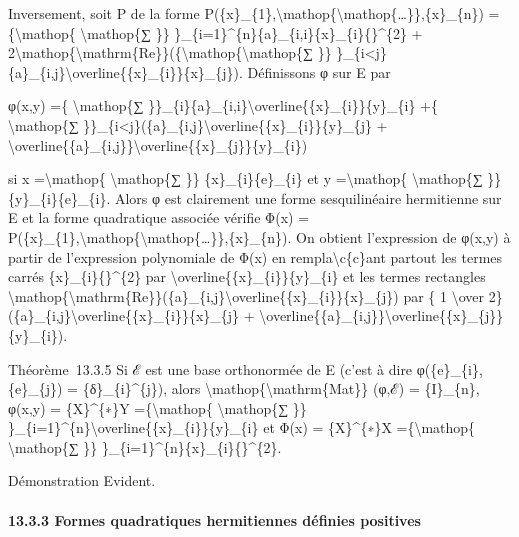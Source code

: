 \documentclass[]{article}
\begin{document}
Inversement, soit P de la forme
P(\{x\}\_\{1\},\textbackslash{}mathop\{\textbackslash{}mathop\{\ldots{}\}\},\{x\}\_\{n\})
=\{\textbackslash{}mathop\{ \textbackslash{}mathop\{∑ \}\}
\}\_\{i=1\}\^{}\{n\}\{a\}\_\{i,i\}\textbar{}\{x\}\_\{i\}\{\textbar{}\}\^{}\{2\}
+
2\textbackslash{}mathop\{\textbackslash{}mathrm\{Re\}\}(\{\textbackslash{}mathop\{\textbackslash{}mathop\{∑
\}\}
\}\_\{i\textless{}j\}\{a\}\_\{i,j\}\textbackslash{}overline\{\{x\}\_\{i\}\}\{x\}\_\{j\}).
Définissons φ sur E par

φ(x,y) =\{ \textbackslash{}mathop\{∑
\}\}\_\{i\}\{a\}\_\{i,i\}\textbackslash{}overline\{\{x\}\_\{i\}\}\{y\}\_\{i\}
+\{ \textbackslash{}mathop\{∑
\}\}\_\{i\textless{}j\}(\{a\}\_\{i,j\}\textbackslash{}overline\{\{x\}\_\{i\}\}\{y\}\_\{j\}
+
\textbackslash{}overline\{\{a\}\_\{i,j\}\}\textbackslash{}overline\{\{x\}\_\{j\}\}\{y\}\_\{i\})

si x =\textbackslash{}mathop\{ \textbackslash{}mathop\{∑ \}\}
\{x\}\_\{i\}\{e\}\_\{i\} et y =\textbackslash{}mathop\{
\textbackslash{}mathop\{∑ \}\} \{y\}\_\{i\}\{e\}\_\{i\}. Alors φ est
clairement une forme sesquilinéaire hermitienne sur E et la forme
quadratique associée vérifie Φ(x) =
P(\{x\}\_\{1\},\textbackslash{}mathop\{\textbackslash{}mathop\{\ldots{}\}\},\{x\}\_\{n\}).
On obtient l'expression de φ(x,y) à partir de l'expression polynomiale
de Φ(x) en rempla\textbackslash{}c\{c\}ant partout les termes carrés
\textbar{}\{x\}\_\{i\}\{\textbar{}\}\^{}\{2\} par
\textbackslash{}overline\{\{x\}\_\{i\}\}\{y\}\_\{i\} et les termes
rectangles
\textbackslash{}mathop\{\textbackslash{}mathrm\{Re\}\}(\{a\}\_\{i,j\}\textbackslash{}overline\{\{x\}\_\{i\}\}\{x\}\_\{j\})
par \{ 1 \textbackslash{}over 2\}
(\{a\}\_\{i,j\}\textbackslash{}overline\{\{x\}\_\{i\}\}\{x\}\_\{j\} +
\textbackslash{}overline\{\{a\}\_\{i,j\}\}\textbackslash{}overline\{\{x\}\_\{j\}\}\{y\}\_\{i\}).

Théorème~13.3.5 Si ℰ est une base orthonormée de E (c'est à dire
φ(\{e\}\_\{i\},\{e\}\_\{j\}) = \{δ\}\_\{i\}\^{}\{j\}), alors
\textbackslash{}mathop\{\textbackslash{}mathrm\{Mat\}\} (φ,ℰ) =
\{I\}\_\{n\}, φ(x,y) = \{X\}\^{}\{∗\}Y =\{\textbackslash{}mathop\{
\textbackslash{}mathop\{∑ \}\}
\}\_\{i=1\}\^{}\{n\}\textbackslash{}overline\{\{x\}\_\{i\}\}\{y\}\_\{i\}
et Φ(x) = \{X\}\^{}\{∗\}X =\{\textbackslash{}mathop\{
\textbackslash{}mathop\{∑ \}\}
\}\_\{i=1\}\^{}\{n\}\textbar{}\{x\}\_\{i\}\{\textbar{}\}\^{}\{2\}.

Démonstration Evident.

\paragraph{13.3.3 Formes quadratiques hermitiennes définies positives}
\end{document}
